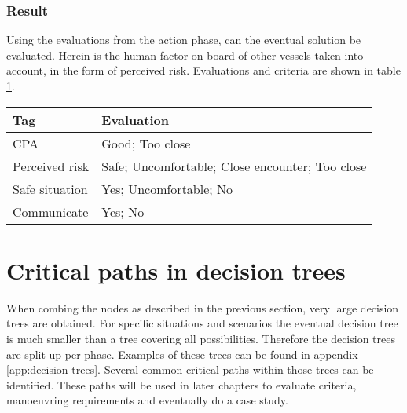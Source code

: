 \subsubsection{Result}
Using the evaluations from the action phase, can the eventual solution be evaluated. Herein is the human factor on board of other vessels taken into account, in the form of perceived risk. Evaluations and criteria are shown in table \ref{tab:criteria-safe-situation}.
\begin{table}[H]
	\begin{tabular}{p{}|p{}}
		\toprule
		Tag & Evaluation\\
		\midrule
		CPA & Good; Too close\\
		Perceived risk & Safe; Uncomfortable; Close encounter; Too close\\
		Safe situation & Yes; Uncomfortable; No\\
		Communicate & Yes; No\\
		\bottomrule
	\end{tabular}
	
	\label{tab:criteria-safe-situation}
\end{table}


\section{Critical paths in decision trees}
When combing the nodes as described in the previous section, very large decision trees are obtained. For specific situations and scenarios the eventual decision tree is much smaller than a tree covering all possibilities. 
Therefore the decision trees are split up per phase. Examples of these trees can be found in appendix \ref{app:decision-trees}. Several common critical paths within those trees can be identified. These paths will be used in later chapters to evaluate criteria, manoeuvring requirements and eventually do a case study.






